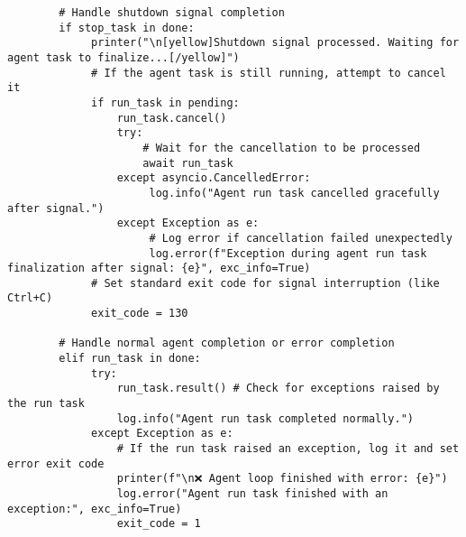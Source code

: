 \documentclass[12pt,a4paper]{article}
\begin{document}
\begin{pageablecode}
\begin{verbatim}
        # Handle shutdown signal completion
        if stop_task in done:
             printer("\n[yellow]Shutdown signal processed. Waiting for agent task to finalize...[/yellow]")
             # If the agent task is still running, attempt to cancel it
             if run_task in pending:
                 run_task.cancel()
                 try:
                     # Wait for the cancellation to be processed
                     await run_task
                 except asyncio.CancelledError:
                      log.info("Agent run task cancelled gracefully after signal.")
                 except Exception as e:
                      # Log error if cancellation failed unexpectedly
                      log.error(f"Exception during agent run task finalization after signal: {e}", exc_info=True)
             # Set standard exit code for signal interruption (like Ctrl+C)
             exit_code = 130

        # Handle normal agent completion or error completion
        elif run_task in done:
             try:
                 run_task.result() # Check for exceptions raised by the run task
                 log.info("Agent run task completed normally.")
             except Exception as e:
                 # If the run task raised an exception, log it and set error exit code
                 printer(f"\n❌ Agent loop finished with error: {e}")
                 log.error("Agent run task finished with an exception:", exc_info=True)
                 exit_code = 1



\end{verbatim}
\end{pageablecode}
\end{document}
